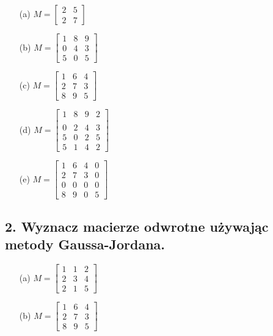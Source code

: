 \begin{enumerate}
    \item[(a)] \( M = \begin{bmatrix} 2 & 5 \\ 2 & 7 \end{bmatrix} \)
    
    \item[(b)] \( M = \begin{bmatrix} 1 & 8 & 9 \\ 0 & 4 & 3 \\ 5 & 0 & 5 \end{bmatrix} \)
    
    \item[(c)] \( M = \begin{bmatrix} 1 & 6 & 4 \\ 2 & 7 & 3 \\ 8 & 9 & 5  \end{bmatrix} \)
    
    \item[(d)] \( M = \begin{bmatrix} 1 & 8 & 9 & 2 \\ \\ 0 & 2 & 4 & 3 \\ 5 & 0 & 2 & 5 \\ 5 & 1 & 4 & 2 \end{bmatrix} \)
    
    \item[(e)] \( M = \begin{bmatrix} 1 & 6 & 4 & 0 \\ 2 & 7 & 3 & 0 \\ 0 & 0 & 0 & 0 \\ 8 & 9 & 0 & 5 \end{bmatrix} \)
\end{enumerate}

\subsection*{2. Wyznacz macierze odwrotne używając metody Gaussa-Jordana.}

\begin{enumerate}
    \item[(a)] \( M = \begin{bmatrix} 1 & 1 & 2 \\ 2 & 3 & 4 \\ 2 & 1 & 5 \end{bmatrix} \)
    
    \item[(b)] \( M = \begin{bmatrix} 1 & 6 & 4 \\ 2 & 7 & 3 \\ 8 & 9 & 5 \end{bmatrix} \)
\end{enumerate}

